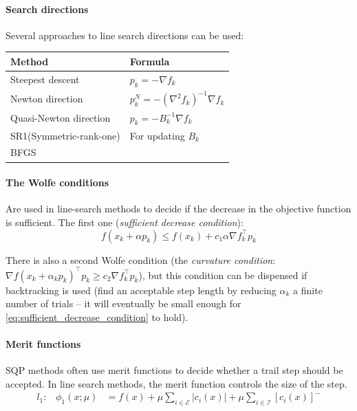 \paragraph{Search directions} Several approaches to line search directions can be used:

\hskip-0.5cm
\begin{tabularx}{\linewidth}{X X}
	\textbf{Method} & \textbf{Formula}\\
	\hline
	Steepest descent & $p_k=-\nabla f_k$\\
	Newton direction & $p_k^N=-(\nabla^2 f_k)^{-1}\nabla f_k$ \\
	Quasi-Newton direction & $p_k=-B_k^{-1}\nabla f_k$ \\
	\quad SR1(Symmetric-rank-one) & For updating $B_k$\\
	\quad BFGS & \\
\end{tabularx}

\paragraph{The Wolfe conditions} 
Are used in line-search methods to decide if the decrease in the objective function is sufficient. The first one (\textit{sufficient decrease condition}):
\begin{equation}
    \label{eq:sufficient_decrease_condition}
    f(x_k+\alpha p_k) \leq f(x_k) + c_1 \alpha \nabla f_k^\top p_k
\end{equation}

There is also a second Wolfe condition (the \textit{curvature condition}: $\nabla f(x_k + \alpha_k p_k)^\top p_k \geq c_2 \nabla f_k^\top p_k$), but this condition can be dispensed if backtracking is used (find an acceptable step length by reducing $\alpha_k$ a finite number of trials -- it will eventually be small enough for \cref{eq:sufficient_decrease_condition} to hold).

\paragraph{Merit functions} SQP methods often use merit functions to decide whether a trail step should be accepted. In line search methods, the merit function controls the size of the step.
%
\begin{equation}
    \begin{split}
        l_1\text{:} \quad \phi_1(x;\mu) &= f(x) + \mu \sum_{i \in \mathcal{E}} |c_i(x)| + \mu \sum_{i \in \mathcal{I}} [c_i(x)]^-\\
    \end{split}
\end{equation}

